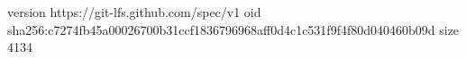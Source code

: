 version https://git-lfs.github.com/spec/v1
oid sha256:c7274fb45a00026700b31ccf1836796968aff0d4c1c531f9f4f80d040460b09d
size 4134
